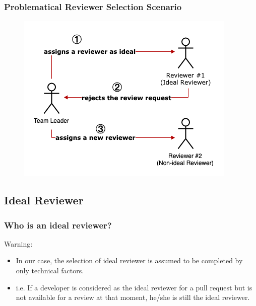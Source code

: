 \documentclass{beamer}
\begin{document}
\begin{frame}
\frametitle{\large Problematical Reviewer Selection Scenario}
  \begin{figure}
    \includegraphics[scale=0.6]{img/gt_3.png}
    \end{figure}

\end{frame}



\subsection{Ideal Reviewer}
\begin{frame}
\frametitle{\large Who is an ideal reviewer?}
    \pause
    \begin{alertblock}{Warning:}
        \begin{itemize}
        \item In our case, the selection of ideal reviewer is assumed to be completed by only technical factors.
        \item i.e. If a developer is considered as the ideal reviewer for a pull request but is not available for a review at that moment, he/she is still the ideal reviewer.
        \end{itemize}
    \end{alertblock}
\end{frame}
\end{document}
